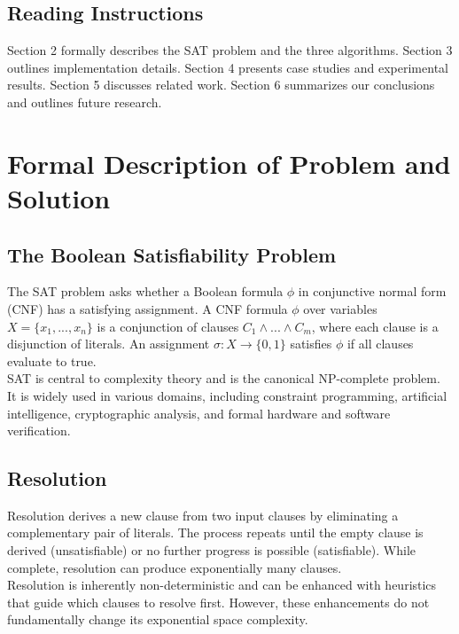 \documentclass[11pt]{article}
\begin{document}
\subsection*{Reading Instructions}
\hspace*{2em}
Section 2 formally describes the SAT problem and the three algorithms. Section 3 outlines implementation details. Section 4 presents case studies and experimental results. Section 5 discusses related work. Section 6 summarizes our conclusions and outlines future research.

\section{Formal Description of Problem and Solution}

\subsection{The Boolean Satisfiability Problem}
\hspace*{2em}
The SAT problem asks whether a Boolean formula \(\phi\) in conjunctive normal form (CNF) has a satisfying assignment. A CNF formula \(\phi\) over variables \(X = \{x_1, ..., x_n\}\) is a conjunction of clauses \(C_1 \land ... \land C_m\), where each clause is a disjunction of literals. An assignment \(\sigma: X \rightarrow \{0, 1\}\) satisfies \(\phi\) if all clauses evaluate to true.\\
\hspace*{2em}
SAT is central to complexity theory and is the canonical NP-complete problem. It is widely used in various domains, including constraint programming, artificial intelligence, cryptographic analysis, and formal hardware and software verification.

\subsection{Resolution}
\hspace*{2em}
Resolution derives a new clause from two input clauses by eliminating a complementary pair of literals. The process repeats until the empty clause is derived (unsatisfiable) or no further progress is possible (satisfiable). While complete, resolution can produce exponentially many clauses.\\
\hspace*{2em}
Resolution is inherently non-deterministic and can be enhanced with heuristics that guide which clauses to resolve first. However, these enhancements do not fundamentally change its exponential space complexity.
\end{document}
